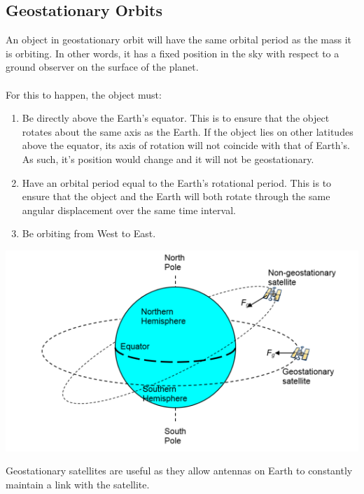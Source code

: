 \documentclass{article}
\begin{document}
\subsection{Geostationary Orbits}
An object in geostationary orbit will have the same orbital period as the mass it is orbiting. In other words, it has a fixed position in the sky with respect to a ground observer on the surface of the planet.
\\
\\For this to happen, the object must:
\begin{enumerate}
    \item Be directly above the Earth's equator. This is to ensure that the object rotates about the same axis as the Earth. If the object lies on other latitudes above the equator, its axis of rotation will not coincide with that of Earth's. As such, it's position would change and it will not be geostationary.
    \item Have an orbital period equal to the Earth's rotational period. This is to ensure that the object and the Earth will both rotate through the same angular displacement over the same time interval.
    \item Be orbiting from West to East.
\end{enumerate}
\begin{center}
    \includegraphics[scale=0.6]{assets/geostationary.png}
\end{center}\leavevmode
Geostationary satellites are useful as they allow antennas on Earth to constantly maintain a link with the satellite.
\end{document}
